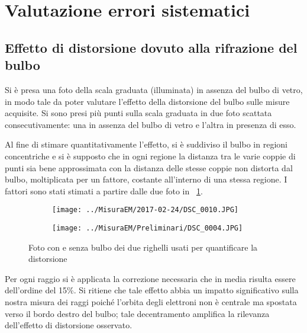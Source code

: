 \documentclass[10pt,a4paper]{article}
\begin{document}
\section{Valutazione errori sistematici}

\subsection{Effetto di distorsione dovuto alla rifrazione del bulbo}
Si è presa una foto della scala graduata (illuminata) in assenza del bulbo di vetro, in modo tale da poter valutare l'effetto della distorsione del bulbo sulle misure acquisite. Si sono presi più punti sulla scala graduata in due foto scattata consecutivamente: una in assenza del bulbo di vetro e l'altra in presenza di esso.

Al fine di stimare quantitativamente l'effetto, si è suddiviso il bulbo in regioni concentriche e si è supposto che in ogni regione la distanza tra le varie coppie di punti sia bene approssimata con la distanza delle stesse coppie non distorta dal bulbo, moltiplicata per un fattore, costante all'interno di una stessa regione. I fattori sono stati stimati a partire dalle due foto in \figurename{~\ref{fig:righelli}}.

\begin{figure}[H]
	\begin{minipage}{0.49\textwidth}
		\begin{figure}[H]
			\centering
			\texttt{[image: ../MisuraEM/2017-02-24/DSC\_0010.JPG]}
		\end{figure}
	\end{minipage}
	\begin{minipage}{0.49\textwidth}
		\begin{figure}[H]
			\centering
			\texttt{[image: ../MisuraEM/Preliminari/DSC\_0004.JPG]}
		\end{figure}
	\end{minipage}
\caption{Foto con e senza bulbo dei due righelli usati per quantificare la distorsione}
\label{fig:righelli}
\end{figure}


Per ogni raggio si è applicata la correzione necessaria che in media risulta essere dell'ordine del 15\%.
Si ritiene che tale effetto abbia un impatto significativo sulla nostra misura dei raggi poiché l'orbita degli elettroni non è centrale ma spostata verso il bordo destro del bulbo; tale decentramento amplifica la rilevanza dell'effetto di distorsione osservato.
\end{document}
